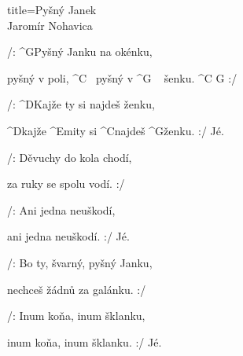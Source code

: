 \begin{song}{title=\predtitle\centering Pyšný Janek \\\large Jaromír Nohavica  \vspace*{-0.3cm}}  %
\begin{centerjustified}
\nejnejvetsi

\sloka 
	/: ^{G{\z}}Pyšný Janku na okénku,

	pyšný v poli, ^{C\,\,\,\,\,}pyšný v ^{G\,\,\,\,\,\,\,}šenku. ^{C\,\,G} :/
	
	/: ^{D{\z}}Kajže ty si najdeš ženku,
	
	^{D{\z}}kajže ^{Emi}ty si ^{C{\z}}najdeš ^{G}ženku. :/ Jé.

\sloka
	/: Děvuchy do kola chodí,

	za ruky se spolu vodí. :/
	
	/: Ani jedna neuškodí,
	
	ani jedna neuškodí. :/ Jé.

\sloka
	/: Bo ty, švarný, pyšný Janku,
	
	nechceš žádnů za galánku. :/
	
	/: Inum koňa, inum šklanku,

	inum koňa, inum šklanku. :/ Jé.

\end{centerjustified}

\mezera

\centering
{}


\setcounter{Slokočet}{0}
\end{song}
